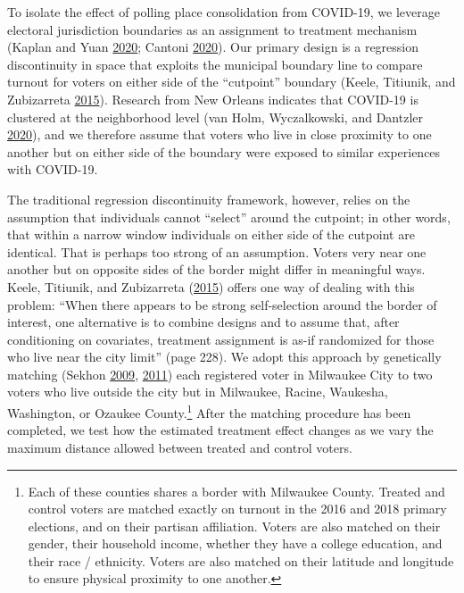 \documentclass[
  12pt,
]{article}
\begin{document}
To isolate the effect of polling place consolidation from COVID-19, we leverage electoral jurisdiction boundaries as an assignment to treatment mechanism (Kaplan and Yuan \protect\hyperlink{ref-Kaplan2020}{2020}; Cantoni \protect\hyperlink{ref-Cantoni2020}{2020}). Our primary design is a regression discontinuity in space that exploits the municipal boundary line to compare turnout for voters on either side of the ``cutpoint'' boundary (Keele, Titiunik, and Zubizarreta \protect\hyperlink{ref-Keele2015}{2015}). Research from New Orleans indicates that COVID-19 is clustered at the neighborhood level (van Holm, Wyczalkowski, and Dantzler \protect\hyperlink{ref-vanHolm2020}{2020}), and we therefore assume that voters who live in close proximity to one another but on either side of the boundary were exposed to similar experiences with COVID-19.

The traditional regression discontinuity framework, however, relies on the assumption that individuals cannot ``select'' around the cutpoint; in other words, that within a narrow window individuals on either side of the cutpoint are identical. That is perhaps too strong of an assumption. Voters very near one another but on opposite sides of the border might differ in meaningful ways. Keele, Titiunik, and Zubizarreta (\protect\hyperlink{ref-Keele2015}{2015}) offers one way of dealing with this problem: ``When there appears to be strong self-selection around the border of interest, one alternative is to combine designs and to assume that, after conditioning on covariates, treatment assignment is as-if randomized for those who live near the city limit'' (page 228). We adopt this approach by genetically matching (Sekhon \protect\hyperlink{ref-Sekhon2009}{2009}, \protect\hyperlink{ref-Sekhon2011}{2011}) each registered voter in Milwaukee City to two voters who live outside the city but in Milwaukee, Racine, Waukesha, Washington, or Ozaukee County.\footnote{Each of these counties shares a border with Milwaukee County. Treated and control voters are matched exactly on turnout in the 2016 and 2018 primary elections, and on their partisan affiliation. Voters are also matched on their gender, their household income, whether they have a college education, and their race / ethnicity. Voters are also matched on their latitude and longitude to ensure physical proximity to one another.} After the matching procedure has been completed, we test how the estimated treatment effect changes as we vary the maximum distance allowed between treated and control voters.
\end{document}
